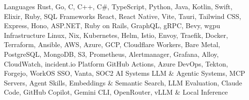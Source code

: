 \begin{cvskills}
  \cvskill
    {Languages}
    {Rust, Go, C, C++, C\#, TypeScript, Python, Java, Kotlin, Swift, Elixir, Ruby, SQL}
  \cvskill
    {Frameworks}
    {React, React Native, Vite, Tauri, Tailwind CSS, Express, Hono, ASP.NET, Ruby on Rails, GraphQL, gRPC, Bevy, wgpu}
  \cvskill
    {Infrastructure}
    {Linux, Nix, Kubernetes, Helm, Istio, Envoy, Traefik, Docker, Terraform, Ansible, AWS, Azure, GCP, Cloudflare Workers, Bare Metal, PostgreSQL, MongoDB, S3, Prometheus, Alertmanager, Grafana, Alloy, CloudWatch, incident.io}
  \cvskill
    {Platform}
    {GitHub Actions, Azure DevOps, Tekton, Forgejo, WorkOS SSO, Vanta, SOC2}
  \cvskill
    {AI Systems}
    {LLM \& Agentic Systems, MCP Servers, Agent Skills, Embeddings \& Semantic Search, LLM Evaluation, Claude Code, GitHub Copilot, Gemini CLI, OpenRouter, vLLM \& Local Inference}
\end{cvskills}
